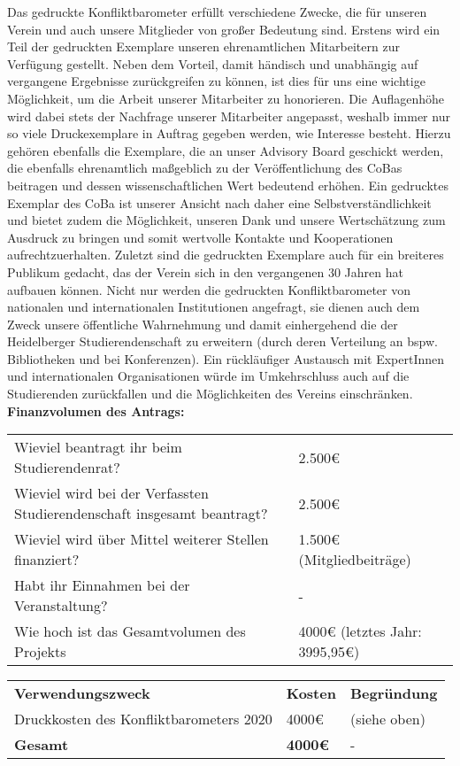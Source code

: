 {    Das gedruckte Konfliktbarometer erfüllt verschiedene Zwecke, die für unseren Verein und auch unsere Mitglieder von großer Bedeutung sind. Erstens wird ein Teil der gedruckten Exemplare unseren ehrenamtlichen Mitarbeitern zur Verfügung gestellt. Neben dem Vorteil, damit händisch und unabhängig auf vergangene Ergebnisse zurückgreifen zu können, ist dies für uns eine wichtige Möglichkeit, um die Arbeit unserer Mitarbeiter zu honorieren. Die Auflagenhöhe wird dabei stets der Nachfrage unserer Mitarbeiter angepasst, weshalb immer nur so viele Druckexemplare in Auftrag gegeben werden, wie Interesse besteht. Hierzu gehören ebenfalls die Exemplare, die an unser Advisory Board geschickt werden, die ebenfalls ehrenamtlich maßgeblich zu der Veröffentlichung des CoBas beitragen und dessen wissenschaftlichen Wert bedeutend erhöhen. Ein gedrucktes Exemplar des CoBa ist unserer Ansicht nach daher eine Selbstverständlichkeit und bietet zudem die Möglichkeit, unseren Dank und unsere Wertschätzung zum Ausdruck zu bringen und somit wertvolle Kontakte und Kooperationen aufrechtzuerhalten. Zuletzt sind die gedruckten Exemplare auch für ein breiteres Publikum gedacht, das der Verein sich in den vergangenen 30 Jahren hat aufbauen können. Nicht nur werden die gedruckten Konfliktbarometer von nationalen und internationalen Institutionen angefragt, sie dienen auch dem Zweck unsere öffentliche Wahrnehmung und damit einhergehend die der Heidelberger Studierendenschaft zu erweitern (durch deren Verteilung an bspw. Bibliotheken und bei Konferenzen). Ein rückläufiger Austausch mit ExpertInnen und internationalen Organisationen würde im Umkehrschluss auch auf die Studierenden zurückfallen und die Möglichkeiten des Vereins einschränken.\\[1em]
    \textbf{Finanzvolumen des Antrags:}\\
    \newline
    \begin{tabular}{l l}
        Wieviel beantragt ihr beim Studierendenrat?                             & 2.500€       \\
        Wieviel wird bei der Verfassten Studierendenschaft insgesamt beantragt? & 2.500€    \\
        Wieviel wird über Mittel weiterer Stellen finanziert?                   & 1.500€ (Mitgliedbeiträge)      \\
        Habt ihr Einnahmen bei der Veranstaltung?                               & -\\
        Wie hoch ist das Gesamtvolumen des Projekts                             &  4000€ (letztes Jahr: 3995,95€)\\
    \end{tabular}
    \newline
    \vspace*{2em}
    \newline
    \begin{tabular}{p{4cm} p{2cm} p{9cm}}
        \textbf{Verwendungszweck} & \textbf{Kosten} & \textbf{Begründung} \\
        Druckkosten des Konfliktbarometers 2020 & 4000€ & (siehe oben)\\
        \textbf{Gesamt} & \textbf{4000€} & - \\  
    \end{tabular}
}
